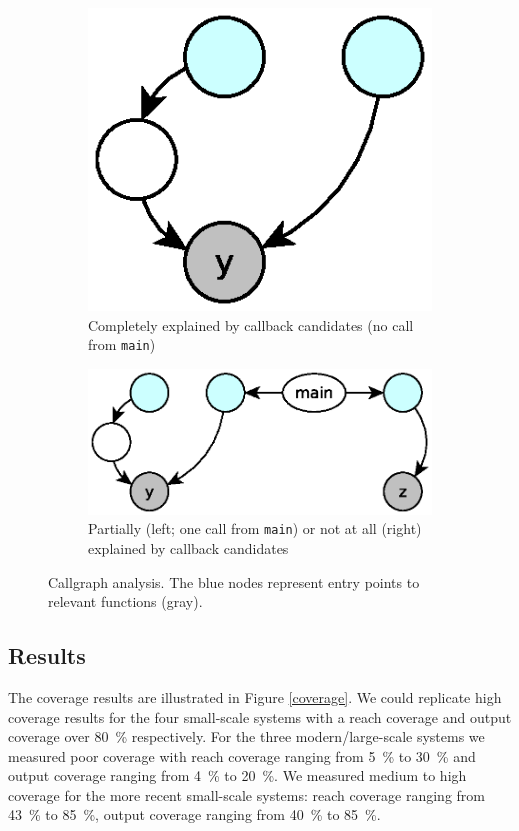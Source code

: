 \documentclass[preprint]{sig-alternate-05-2015}
\begin{document}
\begin{figure}
	\centering
	\begin{subfigure}[t]{0.18\textwidth}
	\centering
		\includegraphics[scale=0.4]{images-paper/callgraph_a}
		\caption{Completely explained by callback candidates (no call from
		\texttt{main})}
		\label{callgraph_a}
    \end{subfigure}
	\hfill
	\begin{subfigure}[t]{0.25\textwidth}
	\centering
		\includegraphics[scale=0.4]{images-paper/callgraph_b}
		\caption{Partially (left; one call from \texttt{main}) or not at all  (right)
		explained by callback candidates}
		\label{callgraph_b}
    \end{subfigure}
    \caption{Callgraph analysis. The blue nodes represent entry points to
    relevant functions (gray).}
    \label{callgraph}
\end{figure}

\subsection{Results} \label{results}

The coverage results are illustrated in Figure \ref{coverage}. We could replicate high coverage results for the four small-scale systems with a reach coverage and output coverage over 80~\% respectively. For the three modern/large-scale systems we measured poor coverage with reach coverage ranging from 5~\% to 30~\% and output coverage ranging from 4~\% to 20~\%. We measured medium to high coverage for the more recent small-scale systems: reach coverage ranging from 43~\% to 85~\%, output coverage ranging from 40~\% to 85~\%.
\end{document}
